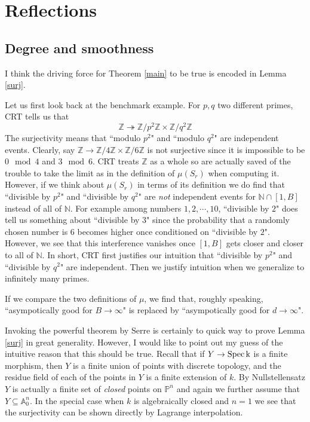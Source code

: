 \documentclass[12pt]{article}
\theoremstyle{plain}
\theoremstyle{definition}
\newcommand{\IA}{\mathbb{A}}
\newcommand{\IN}{\mathbb{N}}
\newcommand{\IP}{\mathbb{P}}
\newcommand{\IZ}{\mathbb{Z}}
\newcommand{\Spec}{\rm Spec\,}
\newcommand{\<}{\langle}
\renewcommand{\>}{\rangle}
\newcommand{\onto}{\twoheadrightarrow}
\begin{document}
\section{Reflections}
\subsection{Degree and smoothness}
I think the driving force for Theorem \ref{main} to be true is encoded in Lemma \ref{surj}. 

Let us first look back at the benchmark example. For $p, q$ two different primes, CRT tells us that 
$$ \IZ \onto \IZ/p^2\IZ \times \IZ/q^2 \IZ $$ The surjectivity means that ``modulo $p^2$" and ``modulo $q^2$" are independent events. Clearly, say $\IZ \to \IZ/4\IZ \times \IZ/6\IZ$ is not surjective since it is impossible to be $0 \mod 4$ and $3 \mod 6$. CRT treats $\IZ$ as a whole so are actually saved of the trouble to take the limit as in the definition of $\mu(S_r)$ when computing it. However, if we think about $\mu(S_r)$ in terms of its definition we do find that ``divisible by $p^2$" and ``divisible by $q^2$" are \textit{not} independent events for $\IN \cap [1, B]$ instead of all of $\IN$. For example among numbers $1, 2, \cdots, 10$, ``divisible by $2$" does tell us something about ``divisible by $3$" since the probability that a randomly chosen number is $6$ becomes higher once conditioned on ``divisible by $2$". However, we see that this interference vanishes once $[1, B]$ gets closer and closer to all of $\IN$. In short, CRT first justifies our intuition that ``divisible by $p^2$" and ``divisible by $q^2$" are independent. Then we justify intuition when we generalize to infinitely many primes. 

If we compare the two definitions of $\mu$, we find that, roughly speaking, ``asympotically good for $B \to \infty$" is replaced by ``asympotically good for $d \to \infty$". 

Invoking the powerful theorem by Serre is certainly to quick way to prove Lemma \ref{surj} in great generality. However, I would like to point out my guess of the intuitive reason that this should be true. Recall that if $Y \to \Spec k$ is a finite morphism, then $Y$ is a finite union of points with discrete topology, and the residue field of each of the points in $Y$ is a finite extension of $k$. By Nullstellensatz $Y$ is actually a finite set of \textit{closed} points on $\IP^n$ and again we further assume that $Y \subseteq \IA^n_0$. In the special case when $k$ is algebraically closed and $n = 1$ we see that the surjectivity can be shown directly by Lagrange interpolation. 
\end{document}
